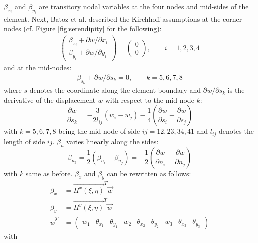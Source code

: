   $\beta_{x_i}$ and $\beta_{y_i}$ are transitory nodal variables at the four nodes and mid-sides of the element.
  Next, Batoz et al. described the Kirchhoff assumptions at the corner nodes (cf. Figure \ref{fig:serendipity} for the following):
  \begin{align}
  \begin{pmatrix}
  \beta_{x_i} + \partial w/\partial x_i \\
  \beta_{y_i} + \partial w/\partial y_i
  \end{pmatrix} = \begin{pmatrix}
  0\\0
  \end{pmatrix},\qquad i = 1,2,3,4
  \end{align}
  and at the mid-nodes:
  \begin{align}
  \beta_{s_k} + \partial w/\partial s_k = 0,\qquad k = 5,6,7,8
  \end{align}
  where $s$ denotes the coordinate along the element boundary and $\partial w/\partial s_k$ is the derivative of the displacement $w$ with respect to the mid-node $k$:
  \begin{equation}
  \frac{\partial w}{\partial s_k} = -\frac{3}{2 l_{ij}}(w_i-w_j) - \frac{1}{4}\left(\frac{\partial w}{\partial s_i} + \frac{\partial w}{\partial s_j}\right)
  \end{equation}
  with $k = 5,6,7,8$ being the mid-node of side $ij = 12, 23, 34, 41$ and $l_{ij}$ denotes the length of side $ij$.
  $\beta_n$ varies linearly along the sides:
  \begin{equation}
  \beta_{n_k} = \frac{1}{2}\left(\beta_{n_i} + \beta_{n_j}\right) = -\frac{1}{2} \left(\frac{\partial w}{\partial n_i} + \frac{\partial w}{\partial n_j}\right)
  \end{equation}
  with $k$ same as before.
  $\beta_x$ and $\beta_y$ can be rewritten as follows:
  \begin{align}
  \beta_x &= \vec{H^x(\xi,\eta)}^T \vec{w}\\
  \beta_y &= \vec{H^y(\xi,\eta)}^T \vec{w}\\
  \vec{w}^T &= \begin{pmatrix}
  w_1&\theta_{x_1}&\theta_{y_1}&w_2&\theta_{x_2}&\theta_{y_2}&w_3&\theta_{x_3}&\theta_{y_3}
  \end{pmatrix} \nonumber
  \end{align}
  with
